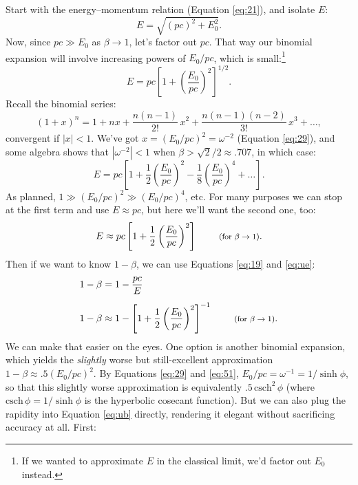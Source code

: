 \documentclass[12pt]{article}
\begin{document}
Start with the energy--momentum relation (Equation \ref{eq:21}), and isolate $E$:
\begin{equation*}
E = \sqrt{(p c)^2 + E_0^2} .
\end{equation*}
Now, since $p c \gg E_0$ as $\beta \rightarrow 1$, let's factor out $p c$. That way our binomial expansion will involve increasing powers of $E_0 / p c$, which is small:\footnote{If we wanted to approximate $E$ in the classical limit, we'd factor out $E_0$ instead.}
\begin{equation*}
E = p c \left[ 1 + \left( \dfrac{E_0}{p c} \right)^2 \right]^{1/2}.
\end{equation*}
Recall the binomial series:
\begin{equation*}
(1+x)^n = 1 + nx + \frac{n(n-1)}{2!} \, x^2 + \frac{n(n-1)(n-2)}{3!} \, x^3 + \dots ,
\end{equation*}
convergent if $|x| < 1$. We've got $x = (E_0 / p c)^2 = \omega^{-2}$ (Equation \ref{eq:29}), and some algebra shows that $|\omega^{-2}|<1$ when $\beta > \sqrt{2}/2 \approx .707$, in which case:
\begin{equation*}
E = p c \left[ 1 + \dfrac{1}{2} \left( \dfrac{E_0}{p c} \right)^2 - \dfrac{1}{8} \left( \dfrac{E_0}{p c} \right)^4 + \dots \right] .
\end{equation*}
As planned, $1 \gg (E_0 / p c)^2 \gg (E_0 / p c)^4$, etc. For many purposes we can stop at the first term and use $E \approx p c$, but here we'll want the second one, too:
\begin{equation}\label{eq:ue}
E \approx p c \left[ 1 + \dfrac{1}{2} \left( \dfrac{E_0}{p c} \right)^2 \right]  \qquad \textrm{\footnotesize{ (for $\beta \rightarrow 1$)}}.
\end{equation}
Then if we want to know $1 - \beta$, we can use Equations \ref{eq:19} and \ref{eq:ue}:
\begin{equation}\label{eq:ub}
\begin{split}
1 - \beta &= 1 - \dfrac{p c}{E} \\[5pt]
1 - \beta & \approx 1 - \left[ 1 + \dfrac{1}{2} \left( \dfrac{E_0}{p c} \right)^2 \right]^{-1} \qquad \textrm{\footnotesize{ (for $\beta \rightarrow 1$)}}.
\end{split}
\end{equation}
We can make that easier on the eyes. One option is another binomial expansion, which yields the \emph{slightly} worse but still-excellent approximation $1 - \beta \approx .5 (E_0 / p c)^2$. By Equations \ref{eq:29} and \ref{eq:51}, $E_0 / p c = \omega^{-1} = 1 / \sinh{\phi}$, so that this slightly worse approximation is equivalently $.5 \, \text{csch}^2 \, \phi$ (where $\text{csch} \, \phi = 1 / \sinh{\phi}$ is the hyperbolic cosecant function). But we can also plug the rapidity into Equation \ref{eq:ub} directly, rendering it elegant without sacrificing accuracy at all. First:
\end{document}
